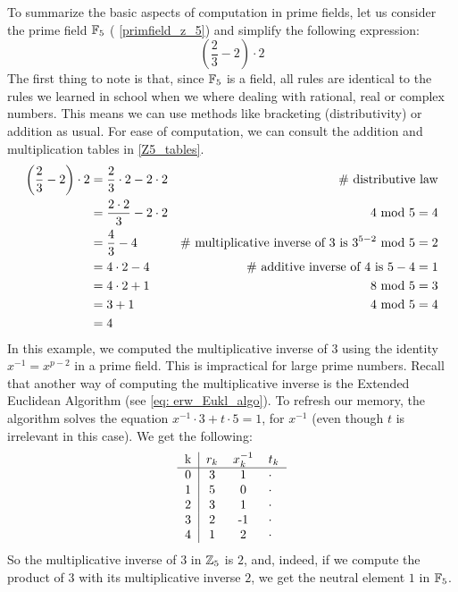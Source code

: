 \begin{example}\label{prime-field-F5}
To summarize the basic aspects of computation in prime fields, let us consider the prime field $\mathbb{F}_5$ (\examplename{} \ref{primfield_z_5}) and simplify the following expression:
\begin{equation}
\left(\frac{2}{3} - 2\right)\cdot 2
\end{equation}
The first thing to note is that, since $\mathbb{F}_5$ is a field, all rules are identical to the rules we learned in school when we where dealing with rational, real or complex numbers. This means we can use methods like bracketing (distributivity) or addition as usual. For ease of computation, we can consult the addition and multiplication tables in \eqref{Z5_tables}.
\begin{align*}
\left(\frac{2}{3} - 2\right)\cdot 2 &=
 \frac{2}{3}\cdot 2 - 2\cdot 2 & \text{\# distributive law}\\
 &= \frac{2\cdot 2}{3} - 2\cdot 2 & 4 \text{ mod } 5=4 \\
 &= \frac{4}{3} - 4 & \text{\# multiplicative inverse of 3 is } 3^{5-2} \text{ mod } 5=2\\
 &= 4\cdot 2 - 4 & \text{\# additive inverse of 4 is } 5-4=1\\
 &= 4\cdot 2 +1 & 8 \text{ mod } 5=3\\
 &= 3 +1 & 4 \text{ mod } 5=4\\
 &= 4
\end{align*}
In this example, we computed the multiplicative inverse of $3$ using the identity
$x^{-1}=x^{p-2}$ in a prime field. This is impractical for large prime numbers. Recall that another way of computing the multiplicative inverse is the Extended Euclidean Algorithm (see \ref{eq: erw_Eukl_algo}).  To refresh our memory, the algorithm solves the equation $x^{-1}\cdot 3 + t \cdot 5 =1$, for $x^{-1}$ (even though $t$ is irrelevant  in this case). We get the following:
\begin{equation}
  \begin{tabular}{c | c c l}
    k & $ r_k $ & $ x^{-1}_k $ & $ t_k $ \\\hline
    0 & 3 & 1 & $\cdot$\ \\
    1 & 5 & 0 & $\cdot$ \\
    2 & 3 & 1 & $\cdot$ \\
    3 & 2 &-1 & $\cdot$ \\
    4 & 1 & 2  & $\cdot$ \\
  \end{tabular}
\end{equation}
So the multiplicative inverse of $3$ in $\mathbb{Z}_5$ is $2$, and, indeed, if we compute the product of $3$ with its multiplicative inverse $2$, we get the neutral element $1$ in $\mathbb{F}_5$.
\end{example}
